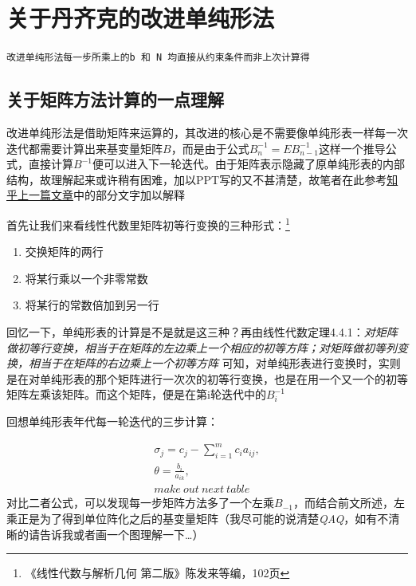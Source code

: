 \documentclass[]{report}
\begin{document}
	\section{关于丹齐克的改进单纯形法}
	\texttt{改进单纯形法每一步所乘上的b 和 N 均直接从约束条件而非上次计算得}\par
		\subsection{关于矩阵方法计算的一点理解}
		改进单纯形法是借助矩阵来运算的，其改进的核心是不需要像单纯形表一样每一次迭代都需要计算出来基变量矩阵$B$，而是由于公式$B_{n}^{-1}=EB_{n-1}^{-1}$这样一个推导公式，直接计算$B^{-1}$便可以进入下一轮迭代。由于矩阵表示隐藏了原单纯形表的内部结构，故理解起来或许稍有困难，加以PPT写的又不甚清楚，故笔者在此参考\href{https://zhuanlan.zhihu.com/p/65512496}{知乎上一篇文章}中的部分文字加以解释\par
		首先让我们来看线性代数里矩阵初等行变换的三种形式：\footnote{《线性代数与解析几何 第二版》陈发来等编，102页}\par
		\begin{enumerate}[label = (\arabic{*})]
			\item 交换矩阵的两行
			\item 将某行乘以一个非零常数
			\item 将某行的常数倍加到另一行
		\end{enumerate}\par
		回忆一下，单纯形表的计算是不是就是这三种？再由线性代数定理4.4.1：\textit{对矩阵做初等行变换，相当于在矩阵的左边乘上一个相应的初等方阵；对矩阵做初等列变换，相当于在矩阵的右边乘上一个初等方阵} 可知，对单纯形表进行变换时，实则是在对单纯形表的那个矩阵进行一次次的初等行变换，也是在用一个又一个的初等矩阵左乘该矩阵。而这个矩阵，便是在第i轮迭代中的$B_i^{-1}$\par
		回想单纯形表年代每一轮迭代的三步计算：\par
		$$\begin{aligned}
			\sigma_j=c_j-\sum_{i=1}^mc_ia_{ij},\\
			\theta=\frac{b_i}{a_{ik}},\\
			make\ out\ next\ table
		\end{aligned}$$
		对比二者公式，可以发现每一步矩阵方法多了一个左乘$B_{-1}$，而结合前文所述，左乘正是为了得到单位阵化之后的基变量矩阵（我尽可能的说清楚\textsf{\textit{QAQ}}，如有不清晰的请告诉我或者画一个图理解一下\dots）
\end{document}
